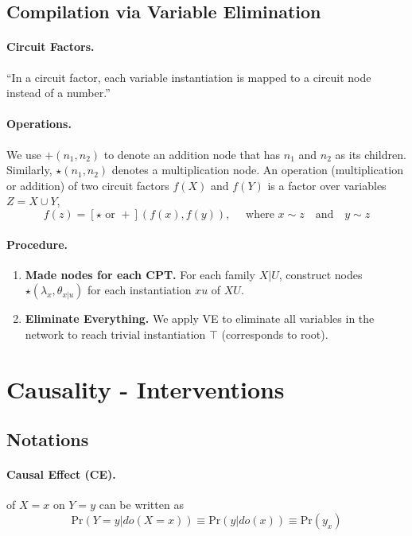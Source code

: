 \documentclass[11pt]{article}
\newcommand{\pr}{\mathrm{Pr}}
\begin{document}
\subsection{Compilation via Variable Elimination}
\paragraph{Circuit Factors.}
``In a circuit factor, each variable instantiation is mapped to a circuit node instead of a number.''

\paragraph{Operations.}
We use $+(n_1, n_2)$ to denote an addition node that has $n_1$ and $n_2$ as its children. Similarly, $\star (n_1, n_2)$ denotes a multiplication node. An operation (multiplication or addition) of two circuit factors $f(X)$ and $f(Y)$ is a factor over variables $Z = X \cup Y$, 
\begin{equation}
	f(z) = [\star \text{ or } +]( f(x), f(y)), \quad \text{ where } x \sim z \quad \text{and} \quad y \sim z 
\end{equation}

\paragraph{Procedure.}
\begin{enumerate}
	\item \textbf{Made nodes for each CPT.} For each family $X|U$, construct nodes $\star (\lambda_x, \theta_{x | u} )$ for each instantiation $xu$ of $XU$. 
	\item \textbf{Eliminate Everything.} We apply VE to eliminate all variables in the network to reach trivial instantiation $\top$ (corresponds to root). 
\end{enumerate}


\section{Causality - Interventions}
\subsection{Notations}
\paragraph{Causal Effect (CE).} of $X = x$ on $Y = y$ can be written as
\begin{equation}
	\pr (Y = y | do(X = x)) \equiv \pr (y | do (x)) \equiv \pr(y_x)
\end{equation}
\end{document}
